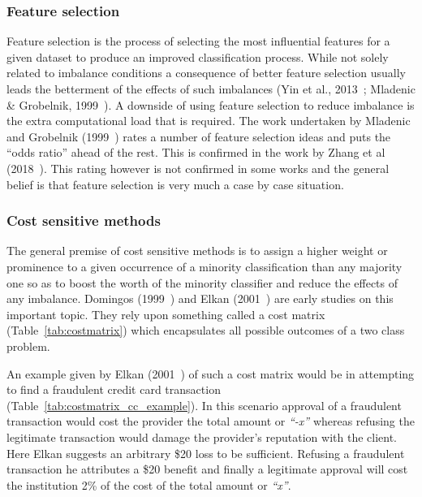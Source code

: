 \subsubsection{Feature selection}
Feature selection is the process of selecting the most influential features for a given dataset to produce an improved classification process. While not solely related to imbalance conditions a consequence of better feature selection usually leads the betterment of the effects of such imbalances (Yin et al., 2013~\cite{yin2013feature}; Mladenic \& Grobelnik, 1999~\cite{mladenic1999feature}). A downside of using feature selection to reduce imbalance is the extra computational load that is required. The work undertaken by Mladenic and Grobelnik (1999~\cite{mladenic1999feature}) rates a number of feature selection ideas and puts the ``odds ratio'' ahead of the rest. This is confirmed in the work by Zhang et al (2018~\cite{zhang2018image}). This rating however is not confirmed in some works and the general belief is that feature selection is very much a case by case situation.

\subsubsection{Cost sensitive methods}
The general premise of cost sensitive methods is to assign a higher weight or prominence to a given occurrence of a minority classification than any majority one so as to boost the worth of the minority classifier and reduce the effects of any imbalance. Domingos (1999~\cite{domingos1999metacost}) and Elkan (2001~\cite{elkan2001foundations}) are early studies on this important topic. They rely upon something called a cost matrix (Table~\ref{tab:costmatrix}) which encapsulates all possible outcomes of a two class problem.



An example given by Elkan (2001~\cite{elkan2001foundations}) of such a cost matrix would be in attempting to find a fraudulent credit card transaction (Table~\ref{tab:costmatrix_cc_example}). In this scenario approval of a fraudulent transaction would cost the provider the total amount or \textit{``-x''} whereas refusing the legitimate transaction would damage the provider's reputation with the client. Here Elkan suggests an arbitrary \$20 loss to be sufficient. Refusing a fraudulent transaction he attributes a \$20 benefit and finally a legitimate approval will cost the institution 2\% of the cost of the total amount or \textit{``x''}.

